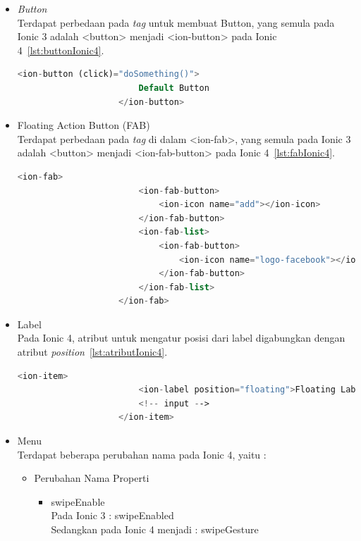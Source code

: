 \begin{enumerate}
\begin{enumerate}
\begin{itemize}
\newpage

			\begin{itemize}
				\item {\it Button} \\
				Terdapat perbedaan pada {\it tag} untuk membuat Button, yang semula pada Ionic 3 adalah <button> menjadi <ion-button> pada Ionic 4~\ref{lst:buttonIonic4}.
				\begin{lstlisting}[language=php, label={lst:buttonIonic4}, caption=Penggunaan Button pada Ionic 4]
					<ion-button (click)="doSomething()">
						Default Button
					</ion-button>
				\end{lstlisting}

				\item Floating Action Button (FAB) \\
				Terdapat perbedaan pada {\it tag} di dalam <ion-fab>, yang semula pada Ionic 3 adalah <button> menjadi <ion-fab-button> pada Ionic 4~\ref{lst:fabIonic4}.
				\begin{lstlisting}[language=php, label={lst:fabIonic4}, caption=Penggunaan Floating Action Button pada Ionic 4]
					<ion-fab>
						<ion-fab-button>
							<ion-icon name="add"></ion-icon>
						</ion-fab-button>
						<ion-fab-list>
							<ion-fab-button>
								<ion-icon name="logo-facebook"></ion-icon>
							</ion-fab-button>
  						</ion-fab-list>
					</ion-fab>
				\end{lstlisting}

				\item Label \\
				Pada Ionic 4, atribut untuk mengatur posisi dari label digabungkan dengan atribut {\it position}~\ref{lst:atributIonic4}.
				\begin{lstlisting}[language=php, label={lst:atributIonic4}, caption=Penggunaan Atribut {\it Position} pada Ionic 4]
					<ion-item>
						<ion-label position="floating">Floating Label</ion-label>
						<!-- input -->
					</ion-item>
				\end{lstlisting}

				\item Menu \\
				Terdapat beberapa perubahan nama pada Ionic 4, yaitu :
				\begin{itemize}
					\item Perubahan Nama Properti
						\begin{itemize}
							\item swipeEnable \\
							Pada Ionic 3 : swipeEnabled \\
							Sedangkan pada Ionic 4 menjadi : swipeGesture


\end{itemize}
\end{itemize}
\end{itemize}
\end{itemize}
\end{enumerate}
\end{enumerate}

